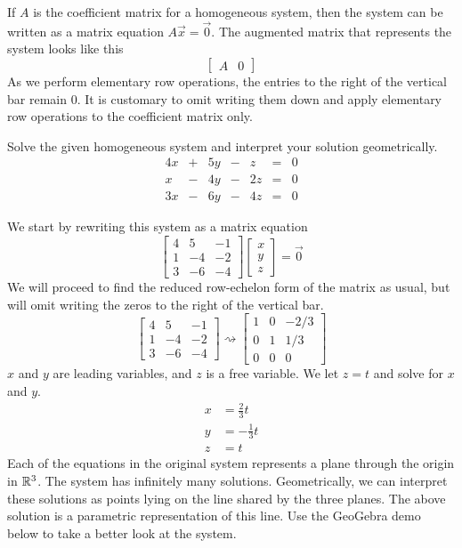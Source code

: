 \documentclass{ximera}
\begin{document}
If $A$ is the coefficient matrix for a homogeneous system, then the system can be written as a matrix equation $A\vec{x}=\vec{0}$. The augmented matrix that represents the system looks like this
$$\left[\begin{array}{c|c}  
 A&0
 \end{array}\right]$$
As we perform elementary row operations, the entries to the right of the vertical bar remain $0$.  It is customary to omit writing them down and apply elementary row operations to the coefficient matrix only.
\begin{example}\label{ex:homogeneoussys} 
Solve the given homogeneous system and interpret your solution geometrically.
$$\begin{array}{ccccccc}
      4x &+ &5y&-&z&= &0 \\
	 x&- &4y&-&2z&= &0 \\
    3x &- &6y&-&4z&= &0
    \end{array}$$

\begin{explanation}
We start by rewriting this system as a matrix equation
$$\begin{bmatrix}4&5&-1\\1&-4&-2\\3&-6&-4\end{bmatrix}\begin{bmatrix}x\\y\\z\end{bmatrix}=\vec{0}$$
We will proceed to find the reduced row-echelon form of the matrix as usual, but will omit writing the zeros to the right of the vertical bar.
$$\begin{bmatrix}4&5&-1\\1&-4&-2\\3&-6&-4\end{bmatrix}\rightsquigarrow \begin{bmatrix}1&0&-2/3\\0&1&1/3\\0&0&0\end{bmatrix}$$
$x$ and $y$ are leading variables, and $z$ is a free variable.  We let $z=t$ and solve for $x$ and $y$.
\begin{align*}
x&=\frac{2}{3}t\\
y&=-\frac{1}{3}t\\
z&=t
\end{align*}
Each of the equations in the original system represents a plane through the origin in $\mathbb{R}^3$.  The system has infinitely many solutions.  Geometrically, we can interpret these solutions as points lying on the line shared by the three planes.  The above solution is a parametric representation of this line.  Use the GeoGebra demo below to take a better look at the system. 
\begin{center}
  \end{center}

\end{explanation}
\end{example}
\end{document}
